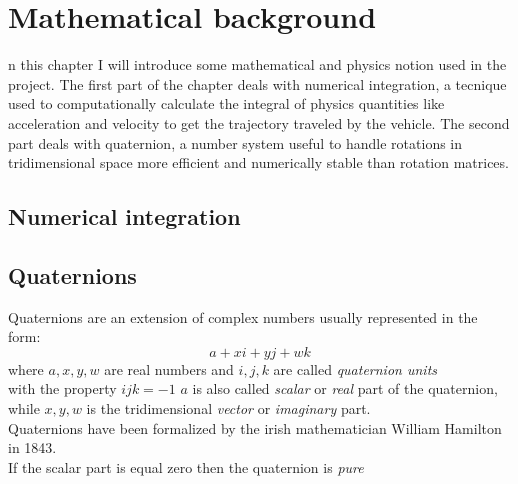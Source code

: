 \let\textcircled=\pgftextcircled
\chapter{Mathematical background}
\label{chap:math_background}

n this chapter I will introduce some mathematical and physics notion used in the project.
The first part of the chapter deals with numerical integration, a tecnique used to computationally calculate the integral of physics quantities like acceleration and velocity to get the trajectory traveled by the vehicle.
The second part deals with quaternion, a number system useful to handle rotations in tridimensional space more efficient and numerically stable than rotation matrices.

\section{Numerical integration}

\section{Quaternions}
Quaternions are an extension of complex numbers usually represented in the form:
$$ a + xi + yj + wk $$
where $a, x, y, w$ are real numbers and $i, j, k$ are called \textit{quaternion units} \\
with the property ${ijk=-1}$
$a$ is also called \textit{scalar} or \textit{real} part of the quaternion, while $x,y,w$ is the tridimensional \textit{vector} or \textit{imaginary} part. \\
Quaternions have been formalized by the irish mathematician William Hamilton in 1843. \\
If the scalar part is equal zero then the quaternion is \textit{pure} \\